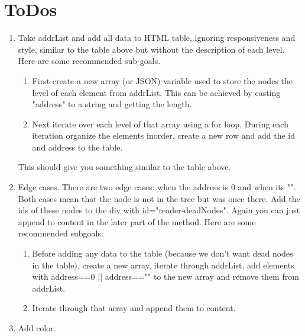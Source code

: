 \documentclass[12pt]{article}
\begin{document}
\section{ToDos}
\begin{enumerate}
	\item Take addrList and add all data to HTML table, ignoring responsiveness and style, similar to the table above but without the description of each level.  Here are some recommended sub-goals.
	\begin{enumerate}
		\item First create a new array (or JSON) variable used to store the nodes the level of each element from addrList.  This can be achieved by casting "address" to a string and getting the length.
		\item Next iterate over each level of that array using a for loop.  During each iteration organize the elements inorder, create a new row and add the id and address to the table.
	\end{enumerate}
	This should give you something similar to the table above.
	\item Edge cases.  There are two edge cases: when the address is 0 and when its "".  Both cases mean that the node is not in the tree but was once there.  Add the ids of these nodes to the div with id="reader-deadNodes".  Again you can just append to content in the later part of the method.  Here are some recommended subgoals:
	\begin{enumerate}
		\item Before adding any data to the table (because we don't want dead nodes in the table), create a new array, iterate through addrList, add elements with address==0 || address=="" to the new array and remove them from addrList.
		\item Iterate through that array and append them to content.
	\end{enumerate}
	\item Add color.
\end{enumerate}
\end{document}
